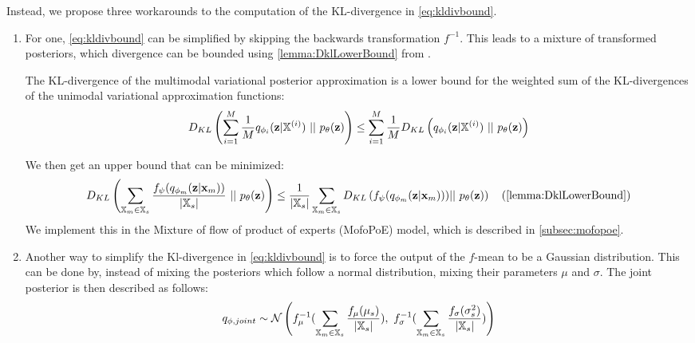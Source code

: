 Instead, we propose three workarounds to the computation of the KL-divergence in \cref{eq:kldivbound}.
\begin{enumerate}

    \item For one, \cref{eq:kldivbound} can be simplified by skipping the backwards transformation $f^{-1}$.
    This leads to a mixture of transformed posteriors, which divergence can be bounded using \cref{lemma:DklLowerBound} from \parencite{sutter_multimodal_2020}.
    \begin{lemma}
        \label{lemma:DklLowerBound}

        The KL-divergence of the multimodal variational posterior approximation is a lower bound for the weighted sum of the KL-divergences of the unimodal variational approximation functions:
        \begin{equation}
            D_{KL} \left( \sum _{i=1} ^M \frac{1}{M}q_{\phi_i}(\textbf{z}|\mathbb{X}^{(i)})\ ||\ p_{\theta}(\textbf{z}) \right) \leq \sum _{i=1} ^M \frac{1}{M} D_{KL} \left( q_{\phi_i}(\textbf{z}|\mathbb{X}^{(i)})\ ||\ p_{\theta}(\textbf{z}) \right)
        \end{equation}
    \end{lemma}
    We then get an upper bound that can be minimized:
    \begin{equation}
        D_{KL}\left(\sum _{\xsetm \in \xsubset} \frac{f_{\psi}(\unimodalpost)}{|\xsubset|}\ ||\ \prior\right) \leq \frac{1}{|\xsubset|} \sum  _{\xsetm \in \xsubset} D_{KL} \left(f_{\psi} (\unimodalpost))||\ \prior \right) \quad (\cref{lemma:DklLowerBound})
    \end{equation}
    We implement this in the Mixture of flow of product of experts (MofoPoE) model, which is described in \cref{subsec:mofopoe}.


    \item Another way to simplify the Kl-divergence in \cref{eq:kldivbound} is to force the output of the $f$-mean to be a Gaussian distribution.
    This can be done by, instead of mixing the posteriors which follow a normal distribution, mixing their parameters $\mu$ and $\sigma$.
    The joint posterior is then described as follows:
    \begin{equation}
        \label{eq:qjointmopgfm}
        q_{\phi, joint} \sim \mathcal{N}\left(  f_{\mu}^{-1}(\sum _{\xsetm \in \xsubset} \frac{f_{\mu}(\mu_s)}{|\xsubset|}),\ f_{\sigma}^{-1}(\sum  _{\xsetm \in \xsubset} \frac{f_{\sigma}(\sigma_s^2)}{|\xsubset|})\right)
    \end{equation}


\end{enumerate}
